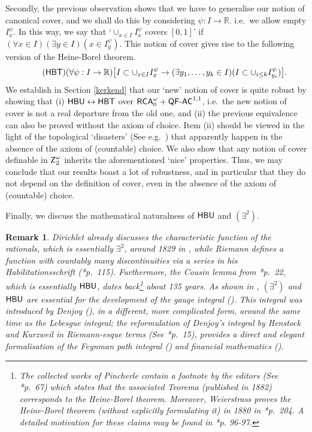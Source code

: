 \documentclass[reqno]{amsart}
\newtheorem{rem}[thm]{Remark}
\newcommand\be{\begin{equation}}
\newcommand\ee{\end{equation}}
\def\Z{\textup{\textsf{Z}}}
\def\RCAo{\textup{\textsf{RCA}}_{0}^{\omega}}
\def\R{{\mathbb  R}}
\def\di{\rightarrow}
\def\asa{\leftrightarrow}
\def\QFAC{\textup{\textsf{QF-AC}}}
\def\HBU{\textup{\textsf{HBU}}}
\def\HBT{\textup{\textsf{HBT}}}
\numberwithin{equation}{section}
\numberwithin{thm}{section}
\begin{document}
Secondly, the previous observation shows that we have to generalise our notion of canonical cover, and we shall do this by considering $\psi:I\di \R$. i.e.\ we allow empty $I_{x}^{\psi}$. 
In this way, we say that `$\cup_{x\in I}I_{x}^{\psi}$ covers $[0,1]$' if $(\forall x\in I)(\exists y\in I)(x\in I_{y}^{\psi})$.  
This notion of cover gives rise to the following version of the Heine-Borel theorem. 
\be\tag{$\HBT$}
(\forall \psi:I\di \R)\big[ I\subset \cup_{x\in I}I_{x}^{\psi}\di   (\exists y_{1}, \dots, y_{k} \in I)(I\subset \cup_{i\leq k}I_{y_{i}}^{\psi}) \big].
\ee
We establish in Section \ref{kerkend} that our `new' notion of cover is quite robust by showing that (i) $\HBU\asa \HBT$ over $\RCAo+\QFAC^{1,1}$, i.e.\ the new notion of cover is not a real departure from the old one, and (ii) the previous equivalence can also be proved without the axiom of choice.  
Item (ii) should be viewed in the light of the topological `disasters' (See e.g.\ \cite{kermend}) that apparently happen in the absence of the axiom of (countable) choice.  We also show that any notion of cover definable in $\Z_{2}^{\omega}$ inherits the aforementioned `nice' properties. 
Thus, we may conclude that our results boast a lot of robustness, and in particular that they do not depend on the definition of cover, even in the absence of the axiom of (countable) choice. 
 
\smallskip

Finally, we discuss the mathematical naturalness of $\HBU$ and $(\exists^{2})$.
\begin{rem}\rm
Dirichlet already discusses the  characteristic function of the rationals, which is essentially $\exists^{2}$, around 1829 in \cite{didi1}, while Riemann defines a function with countably many discontinuities via a series in his \emph{Habilitationsschrift} (\cite{kleine}*{p.~115}).  
Furthermore, the \emph{Cousin lemma} from \cite{cousin1}*{p.\ 22}, which is essentially $\HBU$, dates back\footnote{The collected works of Pincherle contain a footnote by the editors (See \cite{tepelpinch}*{p.\ 67}) which states that the associated \emph{Teorema} (published in 1882) corresponds to the Heine-Borel theorem.  Moreover, Weierstrass proves the Heine-Borel theorem (without explicitly formulating it) in 1880 in \cite{amaimennewekker}*{p.\ 204}.   A detailed motivation for these claims may be found in \cite{medvet}*{p. 96-97}.} about 135 years.  %
As shown in \cite{dagsamIII}, $(\exists^{2})$ and $\HBU$ are essential for the development of the \emph{gauge integral} (\cite{bartle1337}).  This integral was introduced by Denjoy (\cite{ohjoy}), in a different, more complicated form, around the same time as the Lebesgue integral; the reformulation of Denjoy's integral by Henstock and Kurzweil in Riemann-esque terms (See \cite{bartle1337}*{p.\ 15}), provides a \emph{direct} and elegant formalisation of the \emph{Feynman path integral} (\cites{burkdegardener,mullingitover,secondmulling}) and financial mathematics (\cites{mulkerror, secondmulling}).    
\end{rem}
\end{document}
